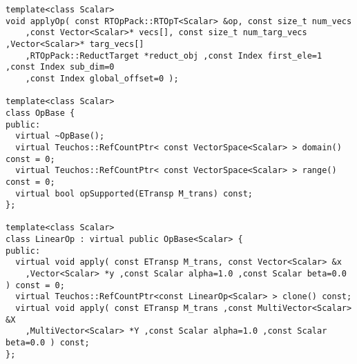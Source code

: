 {\begin{verbatim}
template<class Scalar>
void applyOp( const RTOpPack::RTOpT<Scalar> &op, const size_t num_vecs
    ,const Vector<Scalar>* vecs[], const size_t num_targ_vecs ,Vector<Scalar>* targ_vecs[]
    ,RTOpPack::ReductTarget *reduct_obj ,const Index first_ele=1 ,const Index sub_dim=0
    ,const Index global_offset=0 );

template<class Scalar>
class OpBase {
public:
  virtual ~OpBase();
  virtual Teuchos::RefCountPtr< const VectorSpace<Scalar> > domain() const = 0;
  virtual Teuchos::RefCountPtr< const VectorSpace<Scalar> > range() const = 0;
  virtual bool opSupported(ETransp M_trans) const;
};

template<class Scalar>
class LinearOp : virtual public OpBase<Scalar> {
public:
  virtual void apply( const ETransp M_trans, const Vector<Scalar> &x
    ,Vector<Scalar> *y ,const Scalar alpha=1.0 ,const Scalar beta=0.0 ) const = 0;
  virtual Teuchos::RefCountPtr<const LinearOp<Scalar> > clone() const;
  virtual void apply( const ETransp M_trans ,const MultiVector<Scalar> &X
    ,MultiVector<Scalar> *Y ,const Scalar alpha=1.0 ,const Scalar beta=0.0 ) const;
};


\end{verbatim}}
